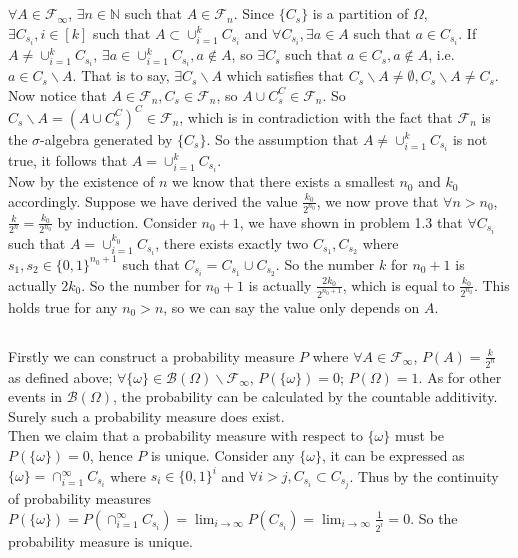 \documentclass[12pt,letterpaper]{article}
\begin{document}
\subsection{}
$\forall A\in\mathcal{F}_{\infty}$, $\exists n\in\mathbb{N}$ such that $A\in\mathcal{F}_{n}$. Since $\{C_s\}$ is a partition of $\Omega$, $\exists C_{s_i}, i\in[k]$ such that $A\subset\cup_{i=1}^{k}C_{s_i}$ and $\forall C_{s_i},\exists a\in A$ such that $a\in C_{s_i}$. If $A\neq\cup_{i=1}^{k}C_{s_i}$, $\exists a\in\cup_{i=1}^kC_{s_i},a\notin A$, so $\exists C_s$ such that $a\in C_s,a\notin A$, i.e. $a\in C_s\backslash A$. That is to say, $\exists C_s\backslash A$ which satisfies that $C_s\backslash A\neq\emptyset, C_s\backslash A\neq C_s$. \\
Now notice that $A\in\mathcal{F}_n,C_s\in\mathcal{F}_n$, so $A\cup C_s^C\in\mathcal{F}_n$. So $C_s\backslash A=(A\cup C_s^C)^C\in\mathcal{F}_n$, which is in contradiction with the fact that $\mathcal{F}_n$ is the $\sigma$-algebra generated by $\{C_s\}$. So the assumption that $A\neq\cup_{i=1}^k C_{s_i}$ is not true, it follows that $A=\cup_{i=1}^k C_{s_i}$.\\
Now by the existence of $n$ we know that there exists a smallest $n_0$ and $k_0$ accordingly. Suppose we have derived the value $\frac{k_0}{2^{n_0}}$, we now prove that $\forall n>n_0$, $\frac{k}{2^n}=\frac{k_0}{2^{n_0}}$ by induction. Consider $n_0+1$, we have shown in problem 1.3 that $\forall C_{s_i}$ such that $A=\cup_{i=1}^{k_0} C_{s_i}$, there exists exactly two $C_{s_1},C_{s_2}$ where $s_1,s_2\in \{0,1\}^{n_0+1}$ such that $C_{s_i}=C_{s_1}\cup C_{s_2}$. So the number $k$ for $n_0+1$ is actually $2k_0$. So the number for $n_0+1$ is actually $\frac{2k_0}{2^{n_0+1}}$, which is equal to $\frac{k_0}{2^{n_0}}$. This holds true for any $n_0>n$, so we can say the value only depends on $A$.
\subsection{}
Firstly we can construct a probability measure $P$ where $\forall A\in\mathcal{F}_{\infty}$, $P(A)=\frac{k}{2^n}$ as defined above; $\forall \{\omega\}\in\mathcal{B}(\Omega)\backslash\mathcal{F}_{\infty}$, $P(\{\omega\})=0$; $P(\Omega)=1$. As for other events in $\mathcal{B}(\Omega)$, the probability can be calculated by the countable additivity. Surely such a probability measure does exist.\\
Then we claim that a probability measure with respect to $\{\omega\}$ must be $P(\{\omega\})=0$, hence $P$ is unique. Consider any $\{\omega\}$, it can be expressed as $\{\omega\}=\cap_{i=1}^{\infty}C_{s_i}$ where $s_i\in\{0,1\}^{i}$ and $\forall i>j, C_{s_i}\subset C_{s_j}$. Thus by the continuity of probability measures $P(\{\omega\})=P(\cap_{i=1}^{\infty}C_{s_i})=\lim_{i\to \infty}P(C_{s_i})=\lim_{i\to\infty}\frac{1}{2^i}=0$. So the probability measure is unique. 
\end{document}
